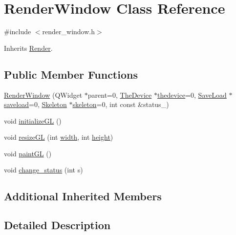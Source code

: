 \hypertarget{class_render_window}{\section{Render\+Window Class Reference}
\label{class_render_window}
}


{\ttfamily \#include $<$render\+\_\+window.\+h$>$}



Inherits \hyperlink{class_render}{Render}.

\subsection*{Public Member Functions}
\begin{DoxyCompactItemize}
\item 
\hyperlink{class_render_window_a378d18b3abc670961b6708d467b6a023}{Render\+Window} (Q\+Widget $\ast$parent=0, \hyperlink{class_the_device}{The\+Device} $\ast$\hyperlink{class_render_aea72c3cd7f9b31257d99cd1be92fe550}{thedevice}=0, \hyperlink{class_save_load}{Save\+Load} $\ast$\hyperlink{class_render_ae359d4eb07503161a339ad8bfd79685e}{saveload}=0, \hyperlink{class_skeleton}{Skeleton} $\ast$\hyperlink{class_render_aa6c02e21d3907a61880c5b3d723e588f}{skeleton}=0, int const \&status\+\_)
\item 
void \hyperlink{class_render_window_af88a2dae613a7b174325417d817d2d6b}{initialize\+G\+L} ()
\item 
void \hyperlink{class_render_window_abc2d513acb2b22a334314e1125b99890}{resize\+G\+L} (int \hyperlink{class_render_a54b5039b8443453e3321997f5697a711}{width}, int \hyperlink{class_render_aa1d23d7ff6a91e29b4d001fdbe185e16}{height})
\item 
void \hyperlink{class_render_window_a69f8331a401933a444f03cef556cf461}{paint\+G\+L} ()
\item 
void \hyperlink{class_render_window_a3e0b35ab573452e3f837f6b780f902dd}{change\+\_\+status} (int s)
\end{DoxyCompactItemize}
\subsection*{Additional Inherited Members}


\subsection{Detailed Description}


